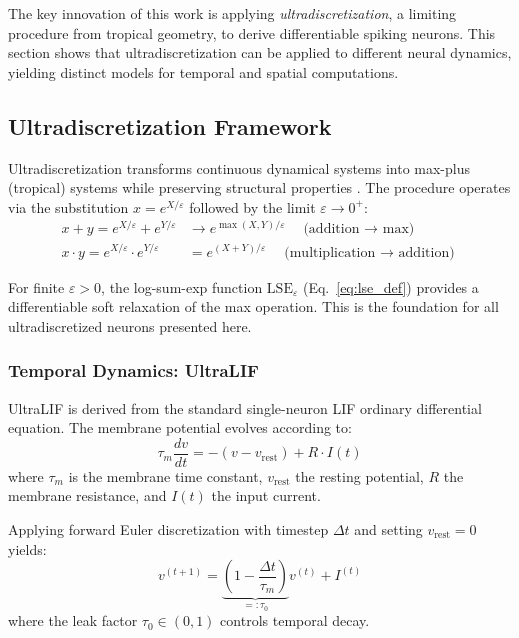 \documentclass{article}
\theoremstyle{plain}
\theoremstyle{definition}
\theoremstyle{remark}
\newcommand{\lse}{\mathrm{LSE}}
\newcommand{\eps}{\varepsilon}
\begin{document}
The key innovation of this work is applying \emph{ultradiscretization}, a limiting procedure from tropical geometry, to derive differentiable spiking neurons. This section shows that ultradiscretization can be applied to different neural dynamics, yielding distinct models for temporal and spatial computations.

\subsection{Ultradiscretization Framework}
\label{sec:ultradiscret}

Ultradiscretization transforms continuous dynamical systems into max-plus (tropical) systems while preserving structural properties \citep{tokihiro1996ultra}. The procedure operates via the substitution $x = e^{X/\eps}$ followed by the limit $\eps \to 0^+$:
\begin{align}
x + y = e^{X/\eps} + e^{Y/\eps} &\to e^{\max(X,Y)/\eps} \quad \text{(addition $\to$ max)} \label{eq:ultra_add}\\
x \cdot y = e^{X/\eps} \cdot e^{Y/\eps} &= e^{(X+Y)/\eps} \quad \text{(multiplication $\to$ addition)} \label{eq:ultra_mult}
\end{align}

For finite $\eps > 0$, the log-sum-exp function $\lse_\eps$ (Eq.~\ref{eq:lse_def}) provides a differentiable soft relaxation of the max operation. This is the foundation for all ultradiscretized neurons presented here.

\subsubsection{Temporal Dynamics: UltraLIF}
\label{sec:ultralif_temporal}

UltraLIF is derived from the standard single-neuron LIF ordinary differential equation. The membrane potential evolves according to:
\begin{equation}
\tau_m \frac{dv}{dt} = -(v - v_\text{rest}) + R \cdot I(t)
\label{eq:lif_ode}
\end{equation}
where $\tau_m$ is the membrane time constant, $v_\text{rest}$ the resting potential, $R$ the membrane resistance, and $I(t)$ the input current.

Applying forward Euler discretization with timestep $\Delta t$ and setting $v_\text{rest} = 0$ yields:
\begin{equation}
v^{(t+1)} = \underbrace{\left(1 - \frac{\Delta t}{\tau_m}\right)}_{=:\tau_0} v^{(t)} + I^{(t)}
\label{eq:lif_discrete}
\end{equation}
where the leak factor $\tau_0 \in (0,1)$ controls temporal decay.
\end{document}
